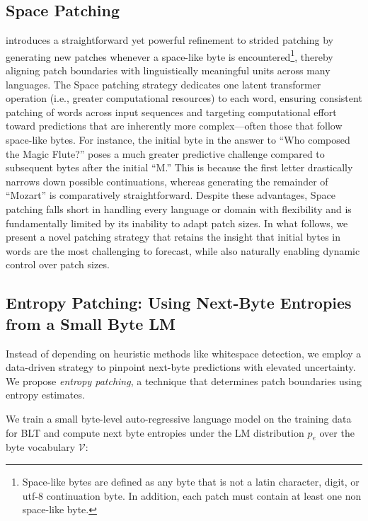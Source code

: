 \subsection{Space Patching}
\label{section:white-patch}

\citet{slagle2024spacebyte} introduces a straightforward yet powerful refinement to strided patching by generating new patches whenever a space-like byte is encountered\footnote{
    Space-like bytes are defined as any byte that is not a latin character, digit, or utf-8 continuation byte. In addition, each patch must contain at least one non space-like byte. }, thereby aligning patch boundaries with linguistically meaningful units across many languages. The Space patching strategy dedicates one latent transformer operation (i.e., greater computational resources) to each word, ensuring consistent patching of words across input sequences and targeting computational effort toward predictions that are inherently more complex—often those that follow space-like bytes. For instance, the initial byte in the answer to ``Who composed the Magic Flute?\uline{\hspace{.6em}}'' poses a much greater predictive challenge compared to subsequent bytes after the initial ``M.'' This is because the first letter drastically narrows down possible continuations, whereas generating the remainder of ``Mozart'' is comparatively straightforward. Despite these advantages, Space patching falls short in handling every language or domain with flexibility and is fundamentally limited by its inability to adapt patch sizes. In what follows, we present a novel patching strategy that retains the insight that initial bytes in words are the most challenging to forecast, while also naturally enabling dynamic control over patch sizes.

\subsection{Entropy Patching: Using Next-Byte Entropies from a Small Byte LM}
\label{section:dyn-patch}

Instead of depending on heuristic methods like whitespace detection, we employ a data-driven strategy to pinpoint next-byte predictions with elevated uncertainty. We propose \textit{entropy patching}, a technique that determines patch boundaries using entropy estimates.

We train a small byte-level auto-regressive language model on the training data for {\textsc BLT} and compute next byte entropies under the LM distribution $p_{e}$ over the byte vocabulary $\mathcal{V}$:

